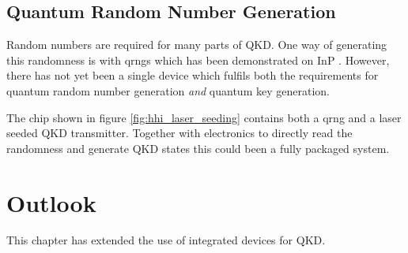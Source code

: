 \subsection{Quantum Random Number Generation}

Random numbers are required for many parts of \ac{QKD}. One way of generating this randomness is with \acp{qrng} which has been demonstrated on \ac{InP} \cite{FrancescoThesis,Abellan2016}. However, there has not yet been a single device which fulfils both the requirements for quantum random number generation \textit{and} quantum key generation.

The chip shown in figure \ref{fig:hhi_laser_seeding} contains both a \ac{qrng} and a laser seeded \ac{QKD} transmitter. Together with electronics to directly read the randomness and generate \ac{QKD} states this could been a fully packaged system.

\section{Outlook}

This chapter has extended the use of integrated devices for \acl{QKD}.

